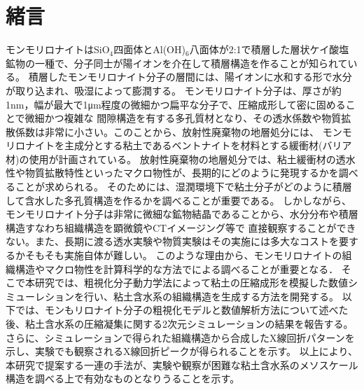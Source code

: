 ﻿\documentclass[11pt,a4j]{jarticle}
\begin{document}
\section{緒言}
モンモリロナイトはSiO$_4$四面体とAl(OH)$_6$八面体が2:1で積層した層状ケイ酸塩鉱物の一種で、分子同士が陽イオンを介在して積層構造を作ることが知られている。
積層したモンモリロナイト分子の層間には、陽イオンに水和する形で水分が取り込まれ、吸湿によって膨潤する。
モンモリロナイト分子は、厚さが約1nm，幅が最大で1μm程度の微細かつ扁平な分子で、圧縮成形して密に固めることで微細かつ複雑な
間隙構造を有する多孔質材となり、その透水係数や物質拡散係数は非常に小さい。このことから、放射性廃棄物の地層処分には、
モンモリロナイトを主成分とする粘土であるベントナイトを材料とする緩衝材(バリア材)の使用が計画されている。
放射性廃棄物の地層処分では、粘土緩衝材の透水性や物質拡散特性といったマクロ物性が、長期的にどのように発現するかを調べることが求められる。
そのためには、湿潤環境下で粘土分子がどのように積層して含水した多孔質構造を作るかを調べることが重要である。
しかしながら、モンモリロナイト分子は非常に微細な鉱物結晶であることから、水分分布や積層構造すなわち組織構造を顕微鏡やCTイメージング等で
直接観察することができない。また、長期に渡る透水実験や物質実験はその実施には多大なコストを要するかそもそも実施自体が難しい。
このような理由から、モンモリロナイトの組織構造やマクロ物性を計算科学的な方法でによる調べることが重要となる．
そこで本研究では、粗視化分子動力学法によって粘土の圧縮成形を模擬した数値シミューレションを行い、粘土含水系の組織構造を生成する方法を開発する。
以下では、モンもリロナイト分子の粗視化モデルと数値解析方法について述べた後、粘土含水系の圧縮凝集に関する2次元シミュレーションの結果を報告する。
さらに、シミュレーションで得られた組織構造から合成したX線回折パターンを示し、実験でも観察されるX線回折ピークが得られることを示す。
以上により、本研究で提案する一連の手法が、実験や観察が困難な粘土含水系のメソスケール構造を調べる上で有効なものとなりうることを示す。
\end{document}
